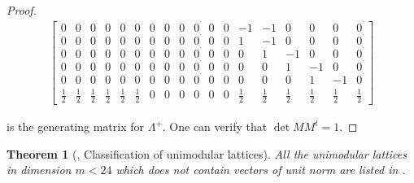 \documentclass{article}
\theoremstyle{plain}
\newtheorem{theorem}{Theorem}[section]
\theoremstyle{definition}
\begin{document}
\begin{proof}
\begin{align}
\begin{bmatrix}{}
    0 & 0 & 0 & 0 & 0 & 0 & 0 & 0 & 0 & 0 & 0 & 0 & -1 & -1 & 0 & 0 & 0 & 0 \\
    0 & 0 & 0 & 0 & 0 & 0 & 0 & 0 & 0 & 0 & 0 & 0 & 1 & -1 & 0 & 0 & 0 & 0 \\
    0 & 0 & 0 & 0 & 0 & 0 & 0 & 0 & 0 & 0 & 0 & 0 & 0 & 1 & -1 & 0 & 0 & 0 \\
    0 & 0 & 0 & 0 & 0 & 0 & 0 & 0 & 0 & 0 & 0 & 0 & 0 & 0 & 1 & -1 & 0 & 0 \\
    0 & 0 & 0 & 0 & 0 & 0 & 0 & 0 & 0 & 0 & 0 & 0 & 0 & 0 & 0 & 1 & -1 & 0 \\
    \frac{1}{2} & \frac{1}{2} & \frac{1}{2} & \frac{1}{2} & \frac{1}{2} & \frac{1}{2} & 0 & 0 & 0 & 0 & 0 & 0 & \frac{1}{2} & \frac{1}{2} & \frac{1}{2} & \frac{1}{2} & \frac{1}{2} & \frac{1}{2}
    \end{bmatrix} 
    \end{align}

    is the generating matrix for $\Lambda^+$. One can verify that $\det MM^t=1$.
    
    \end{proof}

    \begin{theorem}[\cite{conway}, Classification of unimodular lattices]
        All the unimodular lattices in dimension $m < 24$ which does not contain vectors 
        of unit norm are listed in \cite[Section~16.4, Table~16.7]{conway}.
    \end{theorem}
\end{document}
